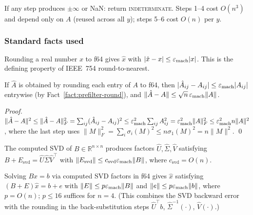 If any step produces $\pm\infty$ or NaN: return
\textsc{indeterminate}.
Steps 1--4 cost $O(n^3)$ and depend only on $A$
(reused across all $y$);
steps 5--6 cost $O(n)$ per $y$.

\subsubsection*{Standard facts used}

\begin{fact}\label{fact:prefilter-round}
Rounding a real number $x$ to f64 gives $\hat{x}$
with $|\hat{x} - x| \le \varepsilon_{\mathrm{mach}}|x|$.
This is the defining property of IEEE~754 round-to-nearest.
\end{fact}

\begin{fact}\label{fact:prefilter-cast}
If $\hat{A}$ is obtained by rounding each entry of $A$
to f64, then $|\hat{A}_{ij} - A_{ij}| \le \varepsilon_{\mathrm{mach}}|A_{ij}|$
entrywise (by Fact~\ref{fact:prefilter-round}), and
$\|\hat{A} - A\| \le \sqrt{n}\,\varepsilon_{\mathrm{mach}}\|A\|$.

\emph{Proof.}
$\|\hat{A} - A\|^2 \le \|\hat{A} - A\|_F^2
= \sum_{ij}(\hat{A}_{ij} - A_{ij})^2
\le \varepsilon_{\mathrm{mach}}^2 \sum_{ij} A_{ij}^2
= \varepsilon_{\mathrm{mach}}^2\|A\|_F^2 \le \varepsilon_{\mathrm{mach}}^2 n\|A\|^2$,
where the last step uses
$\|M\|_F^2 = \sum_i \sigma_i(M)^2 \le n\sigma_1(M)^2
= n\|M\|^2$. \qed
\end{fact}

\begin{fact}\label{fact:prefilter-svd}
The computed SVD of $B \in \mathbb{R}^{n \times n}$ produces
factors $\hat{U}, \hat{\Sigma}, \hat{V}$ satisfying
$B + E_{\mathrm{svd}} = \hat{U}\hat{\Sigma}\hat{V}^\top$
with $\|E_{\mathrm{svd}}\| \le c_{\mathrm{svd}}\varepsilon_{\mathrm{mach}}\|B\|$,
where $c_{\mathrm{svd}} = O(n)$.
\end{fact}

\begin{fact}\label{fact:prefilter-solve}
Solving $Bx = b$ via computed SVD factors in f64 gives $\hat{x}$
satisfying $(B + E)\hat{x} = b + e$ with
$\|E\| \le p\varepsilon_{\mathrm{mach}}\|B\|$ and $\|e\| \le p\varepsilon_{\mathrm{mach}}\|b\|$,
where $p = O(n)$; $p \le 16$ suffices for $n = 4$.
(This combines the SVD backward error with the rounding
in the back-substitution steps
$\hat{U}^\top b$, $\hat{\Sigma}^{-1}(\cdot)$,
$\hat{V}(\cdot)$.)
\end{fact}

